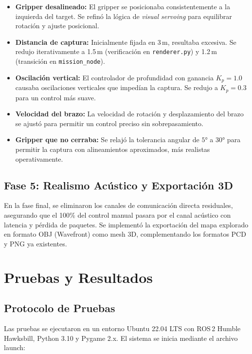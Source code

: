 \documentclass[10pt,twocolumn,letterpaper]{article}
\begin{document}
\begin{itemize}[leftmargin=*,itemsep=2pt]
    \item \textbf{Gripper desalineado:} El gripper se posicionaba consistentemente a la izquierda del target. Se refinó la lógica de \textit{visual servoing} para equilibrar rotación y ajuste posicional.
    \item \textbf{Distancia de captura:} Inicialmente fijada en 3\,m, resultaba excesiva. Se redujo iterativamente a 1.5\,m (verificación en \texttt{renderer.py}) y 1.2\,m (transición en \texttt{mission\_node}).
    \item \textbf{Oscilación vertical:} El controlador de profundidad con ganancia $K_p = 1.0$ causaba oscilaciones verticales que impedían la captura. Se redujo a $K_p = 0.3$ para un control más suave.
    \item \textbf{Velocidad del brazo:} La velocidad de rotación y desplazamiento del brazo se ajustó para permitir un control preciso sin sobrepasamiento.
    \item \textbf{Gripper que no cerraba:} Se relajó la tolerancia angular de $5°$ a $30°$ para permitir la captura con alineamientos aproximados, más realistas operativamente.
\end{itemize}

\subsection{Fase 5: Realismo Acústico y Exportación 3D}

En la fase final, se eliminaron los canales de comunicación directa residuales, asegurando que el 100\% del control manual pasara por el canal acústico con latencia y pérdida de paquetes. Se implementó la exportación del mapa explorado en formato OBJ (Wavefront) como mesh 3D, complementando los formatos PCD y PNG ya existentes.

\section{Pruebas y Resultados}
\label{sec:resultados}

\subsection{Protocolo de Pruebas}

Las pruebas se ejecutaron en un entorno Ubuntu 22.04 LTS con ROS\,2 Humble Hawksbill, Python 3.10 y Pygame 2.x. El sistema se inicia mediante el archivo launch:
\end{document}
